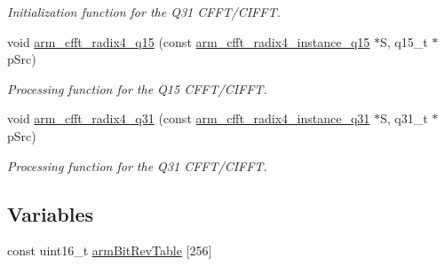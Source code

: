 \begin{DoxyCompactItemize}
\begin{DoxyCompactList}\small\item\em Initialization function for the Q31 C\-F\-F\-T/\-C\-I\-F\-F\-T. \end{DoxyCompactList}\item 
void \hyperlink{group___c_f_f_t___c_i_f_f_t_ga8d66cdac41b8bf6cefdb895456eee84a}{arm\-\_\-cfft\-\_\-radix4\-\_\-q15} (const \hyperlink{structarm__cfft__radix4__instance__q15}{arm\-\_\-cfft\-\_\-radix4\-\_\-instance\-\_\-q15} $\ast$S, q15\-\_\-t $\ast$p\-Src)
\begin{DoxyCompactList}\small\item\em Processing function for the Q15 C\-F\-F\-T/\-C\-I\-F\-F\-T. \end{DoxyCompactList}\item 
void \hyperlink{group___c_f_f_t___c_i_f_f_t_gafde3ee1f58cf393b45a9073174fff548}{arm\-\_\-cfft\-\_\-radix4\-\_\-q31} (const \hyperlink{structarm__cfft__radix4__instance__q31}{arm\-\_\-cfft\-\_\-radix4\-\_\-instance\-\_\-q31} $\ast$S, q31\-\_\-t $\ast$p\-Src)
\begin{DoxyCompactList}\small\item\em Processing function for the Q31 C\-F\-F\-T/\-C\-I\-F\-F\-T. \end{DoxyCompactList}\end{DoxyCompactItemize}
\subsection*{Variables}
\begin{DoxyCompactItemize}
\item 
const uint16\-\_\-t \hyperlink{group___c_f_f_t___c_i_f_f_t_gaaa17ffb170c2ca8a37d5c62c09e334ba}{arm\-Bit\-Rev\-Table} \mbox{[}256\mbox{]}
\end{DoxyCompactItemize}


